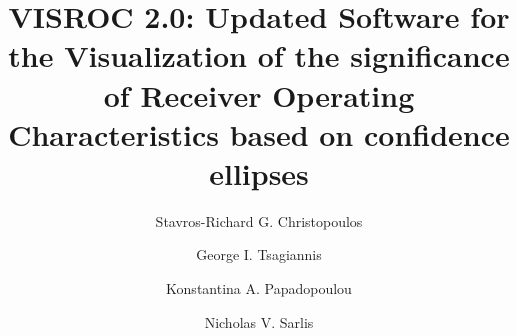 \documentclass[preprint,12pt]{elsarticle}
\begin{document}
\newcommand{\onlinecite}[1]{\hspace{-1 ex} \nocite{#1}\citenum{#1}} 

\begin{frontmatter}



\title{VISROC 2.0: Updated Software for the Visualization of the significance of Receiver Operating Characteristics based on confidence ellipses}


\author[a,b]{Stavros-Richard G. Christopoulos}
\author[c]{George I. Tsagiannis}
\author[a]{Konstantina A. Papadopoulou}
\author[b,d]{Nicholas V. Sarlis}


\address[a]{Faculty of Engineering, Environment, and Computing, Coventry University, Coventry, UK}
\address[b]{Solid Earth Physics Institute, Physics Department, National and Kapodistrian University of Athens,
Panepistimiopolis, Zografos 157 84, Athens, Greece}
\address[c]{UFR SSA (Social Sciences and Administration), Paris Nanterre University, 92001 Nanterre, France}
\address[d]{Section of Condensed Matter Physics, Physics Department, National and Kapodistrian  University of Athens,
Panepistimiopolis, Zografos 157 84, Athens, Greece}

\begin{abstract}


\end{abstract}
\end{frontmatter}
\end{document}
